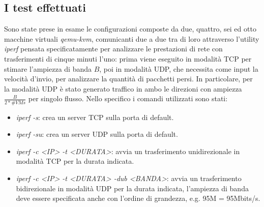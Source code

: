 \subsection{I test effettuati}
Sono state prese in esame le configurazioni composte da due, quattro, sei ed otto macchine virtuali {\em qemu-kvm}, comunicanti due a due tra di loro attraverso l'utility {\em iperf} pensata specificatamente per analizzare le prestazioni di rete con trasferimenti di cinque minuti l'uno: prima viene eseguito in modalità TCP per stimare l'ampiezza di banda $B$, poi in modalità UDP, che necessita come input la velocità d'invio, per analizzare la quantità di pacchetti persi. In particolare, per la modalità UDP è stato generato traffico in ambo le direzioni con ampiezza $ \frac{B}{2*\#VMs} $ per singolo flusso. Nello specifico i comandi utilizzati sono stati:
\begin{itemize}
\item {\em iperf -s}: crea un server TCP sulla porta di default.
\item {\em iperf -su}: crea un server UDP sulla porta di default.
\item {\em iperf -c <IP> -t <DURATA>}: avvia un trasferimento unidirezionale in modalità TCP per la durata indicata.
\item {\em iperf -c <IP> -t <DURATA> -dub <BANDA>}: avvia un trasferimento bidirezionale in modalità UDP per la durata indicata, l'ampiezza di banda deve essere specificata anche con l'ordine di grandezza, e.g. 95M = 95Mbits/s.
\end{itemize}

